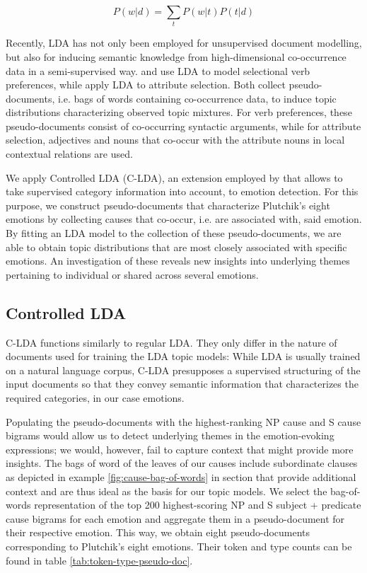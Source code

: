 \begin{equation} \label{eq:lda_distribution}
P(w|d) = \sum_t P(w|t) P(t|d)
\end{equation}

Recently, LDA has not only been employed for unsupervised document modelling, but also for inducing semantic knowledge from high-dimensional co-occurrence data in a semi-supervised way. \citeauthor{lda_cite1} and \citeauthor{lda_cite2} use LDA to model selectional verb preferences, while \citeauthor{supervised_lda} apply LDA to attribute selection. Both collect pseudo-documents, i.e. bags of words containing co-occurrence data, to induce topic distributions characterizing observed topic mixtures. For verb preferences, these pseudo-documents consist of co-occurring syntactic arguments, while for attribute selection, adjectives and nouns that co-occur with the attribute nouns in local contextual relations are used.

We apply Controlled LDA (C-LDA), an extension employed by \citeauthor{supervised_lda} that allows to take supervised category information into account, to emotion detection. For this purpose, we construct pseudo-documents that characterize Plutchik's eight emotions by collecting causes that co-occur, i.e. are associated with, said emotion. By fitting an LDA model to the collection of these pseudo-documents, we are able to obtain topic distributions that are most closely associated with specific emotions. An investigation of these reveals new insights into underlying themes pertaining to individual or shared across several emotions.

\subsection{Controlled LDA}

C-LDA functions similarly to regular LDA. They only differ in the nature of documents used for training the LDA topic models: While LDA is usually trained on a natural language corpus, C-LDA presupposes a supervised structuring of the input documents so that they convey semantic information that characterizes the required categories, in our case emotions.

Populating the pseudo-documents with the highest-ranking NP cause and S cause bigrams would allow us to detect underlying themes in the emotion-evoking expressions; we would, however, fail to capture context that might provide more insights. The bags of word of the leaves of our causes include subordinate clauses as depicted in example \ref{fig:cause-bag-of-words} in section \label{sec:extraction_section} that provide additional context and are thus ideal as the basis for our topic models. We select the bag-of-words representation of the top 200 highest-scoring NP and S subject + predicate cause bigrams for each emotion and aggregate them in a pseudo-document for their respective emotion. This way, we obtain eight pseudo-documents corresponding to Plutchik's eight emotions. Their token and type counts can be found in table \ref{tab:token-type-pseudo-doc}.

